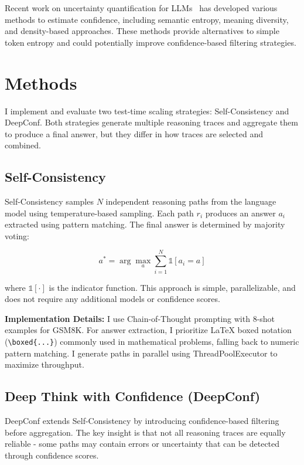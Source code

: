 \documentclass[11pt]{article}
\begin{document}
Recent work on uncertainty quantification for LLMs~\cite{shelmanov2024benchmarking} has developed various methods to estimate confidence, including semantic entropy, meaning diversity, and density-based approaches. These methods provide alternatives to simple token entropy and could potentially improve confidence-based filtering strategies.

\section{Methods}

I implement and evaluate two test-time scaling strategies: Self-Consistency and DeepConf. Both strategies generate multiple reasoning traces and aggregate them to produce a final answer, but they differ in how traces are selected and combined.

\subsection{Self-Consistency}

Self-Consistency samples $N$ independent reasoning paths from the language model using temperature-based sampling. Each path $r_i$ produces an answer $a_i$ extracted using pattern matching. The final answer is determined by majority voting:

\begin{equation}
a^* = \arg\max_{a} \sum_{i=1}^{N} \mathbb{1}[a_i = a]
\end{equation}

where $\mathbb{1}[\cdot]$ is the indicator function. This approach is simple, parallelizable, and does not require any additional models or confidence scores.

\textbf{Implementation Details:} I use Chain-of-Thought prompting with 8-shot examples for GSM8K. For answer extraction, I prioritize LaTeX boxed notation (\texttt{\textbackslash boxed\{...\}}) commonly used in mathematical problems, falling back to numeric pattern matching. I generate paths in parallel using ThreadPoolExecutor to maximize throughput.

\subsection{Deep Think with Confidence (DeepConf)}

DeepConf extends Self-Consistency by introducing confidence-based filtering before aggregation. The key insight is that not all reasoning traces are equally reliable - some paths may contain errors or uncertainty that can be detected through confidence scores.
\end{document}
